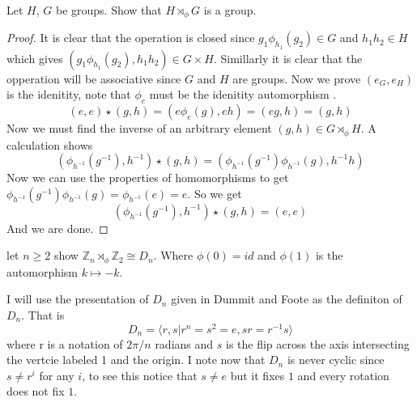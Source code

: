 \documentclass[11pt]{homework}
\newcommand{\Z}{\mathbb{Z}}
\newcommand{\semi}{\rtimes_\phi}
\begin{document}
\maketitle

\question
Let $H$, $G$ be groups. Show that $H \semi G$ is a group. 

\begin{proof}
    It is clear that the operation is closed since $g_1 \phi_{h_1}(g_2) \in G$ and $h_1 h_2 \in H$ which gives $(g_1 \phi_{h_1}(g_2), h_1 h_2) \in G \times H$. 
    Simillarly it is clear that the opperation will be associative since $G$ and $H$ are groups. Now we prove $(e_G, e_H)$ is the idenitity, note that 
    $\phi_e$ must be the idenitity automorphism .
    \[(e, e) \star (g, h) = (e \phi_e (g), e h) = (eg, h) = (g, h)\] 
    Now we must find the inverse of an arbitrary element $(g, h) \in G \semi H$. A calculation shows 
    \[(\phi_{h^{ - 1}}(g^{ - 1}), h^{-1}) \star (g, h) = (\phi_{h^{ - 1}}(g^{-1}) \phi_{h^{ - 1}}(g), h^{-1}h ) \] 
    Now we can use the properties of homomorphisms to get $\phi_{h^{ - 1}}(g^{-1}) \phi_{h^{ - 1}}(g) = \phi_{h^{ - 1}}(e) = e $. 
    So we get 
    \[ (\phi_{h^{ - 1}}(g^{ - 1}), h^{-1}) \star (g, h) = (e, e) \]
    And we are done. 
    
\end{proof}
\question
let $n \geq 2$ show $\Z_n \semi \Z_2 \cong D_n$. Where $\phi(0) = id$ and $\phi(1)$ is the 
automorphism $k \mapsto -k$. 


I will use the presentation of $D_n$ given in Dummit and Foote as the definiton of $D_n$. 
That is 
\[D_n = \langle r,s | r^n = s^2 = e ,s r = r^{-1}s \rangle \]
where r is a notation of $2\pi /n$ radians and $s$ is the flip across the axis intersecting the vertcie labeled 1 and the origin. 
I note now that $D_n$ is never cyclic since $s \neq r^i $ for any $i$, to see this notice that $s \neq e$ but it fixes $1$ and 
every rotation does not fix $1$. 
\end{document}
